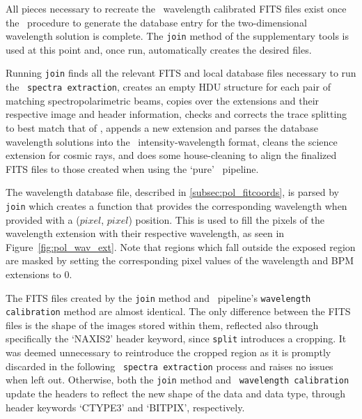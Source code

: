 All pieces necessary to recreate the \polsalt\ wavelength calibrated \gls{FITS} files exist once the \iraf\ procedure to generate the database entry for the two-dimensional wavelength solution is complete. The \texttt{join} method of the supplementary tools is used at this point and, once run, automatically creates the desired files.

Running \texttt{join} finds all the relevant \gls{FITS} and local database files necessary to run the \polsalt\ \texttt{spectra extraction}, creates an empty \gls{HDU} structure for each pair of matching spectropolarimetric beams, copies over the extensions and their respective image and header information, checks and corrects the trace splitting to best match that of \polsalt, appends a new extension and parses the database wavelength solutions into the \polsalt\ intensity-wavelength format, cleans the science extension for cosmic rays, and does some house-cleaning to align the finalized \gls{FITS} files to those created when using the `pure' \polsalt\ pipeline.

The wavelength database file, described in \autoref{subsec:pol_fitcoords}, is parsed by \texttt{join} which creates a function that provides the corresponding wavelength when provided with a ($pixel$, $pixel$) position. This is used to fill the pixels of the wavelength extension with their respective wavelength, as seen in Figure~\ref{fig:pol_wav_ext}. Note that regions which fall outside the exposed region are masked by setting the corresponding pixel values of the wavelength and \gls{BPM} extensions to $0$.

The \gls{FITS} files created by the \texttt{join} method and \polsalt\ pipeline's \texttt{wavelength calibration} method are almost identical. The only difference between the \gls{FITS} files is the shape of the images stored within them, reflected also through specifically the `NAXIS2' header keyword, since \texttt{split} introduces a cropping. It was deemed unnecessary to reintroduce the cropped region as it is promptly discarded in the following \polsalt\ \texttt{spectra extraction} process and raises no issues when left out. Otherwise, both the \texttt{join} method and \polsalt\ \texttt{wavelength calibration} update the headers to reflect the new shape of the data and data type, through header keywords `CTYPE3' and `BITPIX', respectively.

